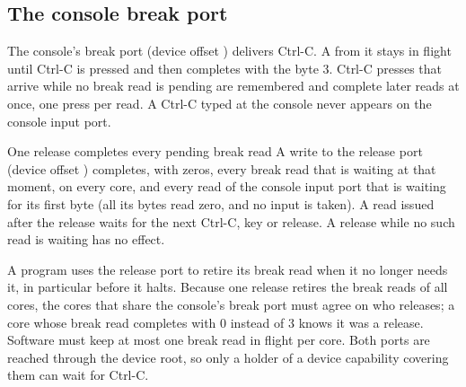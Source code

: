 \subsection{The console break port}\label{sec:break}

The console's break port (device offset ) delivers Ctrl-C. A  from it stays in
flight until Ctrl-C is pressed and then completes with the byte 3. Ctrl-C presses that arrive while no
break read is pending are remembered and complete later reads at once, one press per read. A Ctrl-C typed at
the console never appears on the console input port.

\begin{rule*}{One release completes every pending break read}
A write to the release port (device offset ) completes, with zeros, every break read that is
waiting at that moment, on every core, and every read of the console input port that is waiting for its
first byte (all its bytes read zero, and no input is taken). A read issued after the release waits for
the next Ctrl-C, key or release. A release while no such read is waiting has no effect.
\end{rule*}

A program uses the release port to retire its break read when it no longer needs it, in particular
before it halts. Because one release retires the break reads of all cores, the cores that share the
console's break port must agree on who releases; a core whose break read completes with 0 instead of 3
knows it was a release. Software must keep at most one break read in flight per core. Both ports are
reached through the device root, so only a holder of a device capability covering them can wait for
Ctrl-C.
